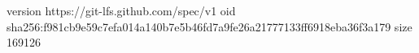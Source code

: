 version https://git-lfs.github.com/spec/v1
oid sha256:f981cb9e59c7efa014a140b7e5b46fd7a9fe26a21777133ff6918eba36f3a179
size 169126
